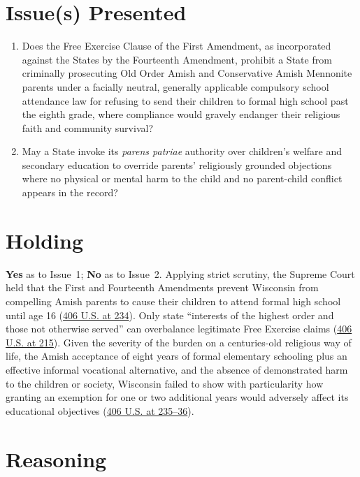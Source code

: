 \documentclass[12pt]{article}
\begin{document}
\section{Issue(s) Presented}

\begin{enumerate}
  \item Does the Free Exercise Clause of the First Amendment, as incorporated against the States by the Fourteenth Amendment, prohibit a State from criminally prosecuting Old Order Amish and Conservative Amish Mennonite parents under a facially neutral, generally applicable compulsory school attendance law for refusing to send their children to formal high school past the eighth grade, where compliance would gravely endanger their religious faith and community survival?
  \item May a State invoke its \emph{parens patriae} authority over children's welfare and secondary education to override parents' religiously grounded objections where no physical or mental harm to the child and no parent-child conflict appears in the record?
\end{enumerate}

\section{Holding}

\textbf{Yes} as to Issue~1; \textbf{No} as to Issue~2. Applying strict scrutiny, the Supreme Court held that the First and Fourteenth Amendments prevent Wisconsin from compelling Amish parents to cause their children to attend formal high school until age 16 (\href{https://supreme.justia.com/cases/federal/us/406/205/}{406 U.S. at 234}). Only state ``interests of the highest order and those not otherwise served'' can overbalance legitimate Free Exercise claims (\href{https://supreme.justia.com/cases/federal/us/406/205/}{406 U.S. at 215}). Given the severity of the burden on a centuries-old religious way of life, the Amish acceptance of eight years of formal elementary schooling plus an effective informal vocational alternative, and the absence of demonstrated harm to the children or society, Wisconsin failed to show with particularity how granting an exemption for one or two additional years would adversely affect its educational objectives (\href{https://supreme.justia.com/cases/federal/us/406/205/}{406 U.S. at 235--36}).

\section{Reasoning}
\end{document}
